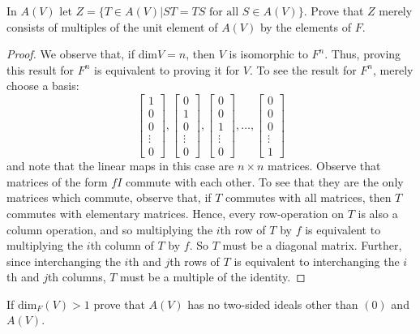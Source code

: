 \documentclass[12pt,leqno]{article}
\numberwithin{equation}{section}
\newcommand{\question}[2] {\vspace{.25in} \noindent\fbox{#1} #2 \vspace{.10in}}
\theoremstyle{definition}
\begin{document}
\question{7}{In $A(V)$ let $Z=\{T\in A(V)|ST=TS\text{ for all }S\in A(V)\}$. Prove that $Z$ merely consists of multiples of the unit element of $A(V)$ by the elements of $F$.}

\begin{proof}
We observe that, if $\text{dim}V=n$, then $V$ is isomorphic to $F^n$. Thus, proving this result for $F^n$ is equivalent to proving it for $V$. To see the result for $F^n$, merely choose a basis:\[\begin{bmatrix}1\\0\\0\\\vdots\\0\end{bmatrix},\begin{bmatrix}0\\1\\0\\\vdots\\0\end{bmatrix},\begin{bmatrix}0\\0\\1\\\vdots\\0\end{bmatrix},\hdots,\begin{bmatrix}0\\0\\0\\\vdots\\1\end{bmatrix}\] and note that the linear maps in this case are $n\times n$ matrices. Observe that matrices of the form $fI$ commute with each other. To see that they are the only matrices which commute, observe that, if $T$ commutes with all matrices, then $T$ commutes with elementary matrices. Hence, every row-operation on $T$ is also a column operation, and so multiplying the $i$th row of $T$ by $f$ is equivalent to multiplying the $i$th column of $T$ by $f$. So $T$ must be a diagonal matrix. Further, since interchanging the $i$th and $j$th rows of $T$ is equivalent to interchanging the $i$th and $j$th columns, $T$ must be a multiple of the identity.
\end{proof}

\question{8}{If $\text{dim}_F(V)>1$ prove that $A(V)$ has no two-sided ideals other than $(0)$ and $A(V)$.}
\end{document}
